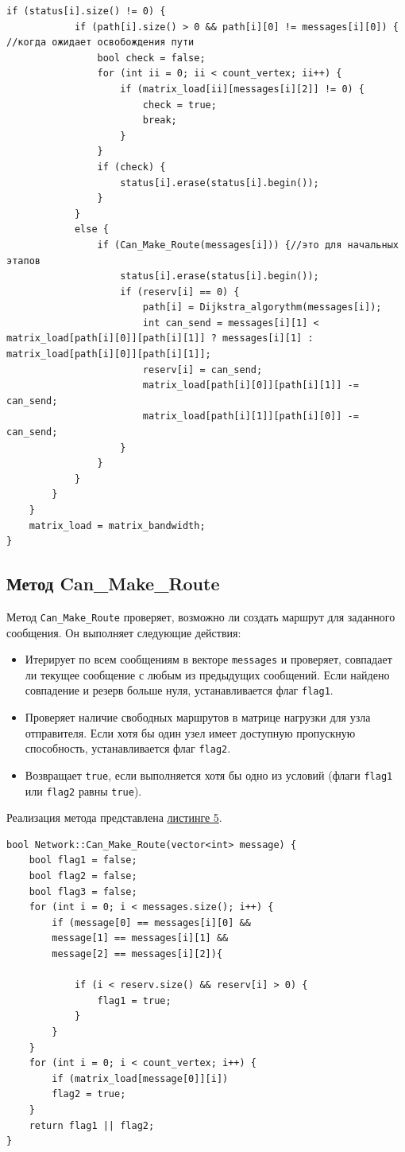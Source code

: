 \documentclass[11pt,a4paper,final]{article} %
\begin{document}
\begin{lstlisting}[label=lst4, caption = {Метод NextStep}]
		if (status[i].size() != 0) {
			if (path[i].size() > 0 && path[i][0] != messages[i][0]) { //когда ожидает освобождения пути
				bool check = false;
				for (int ii = 0; ii < count_vertex; ii++) {
					if (matrix_load[ii][messages[i][2]] != 0) {
						check = true;
						break;
					}
				}
				if (check) {
					status[i].erase(status[i].begin());
				}
			}
			else {
				if (Can_Make_Route(messages[i])) {//это для начальных этапов
					status[i].erase(status[i].begin());
					if (reserv[i] == 0) {
						path[i] = Dijkstra_algorythm(messages[i]);
						int can_send = messages[i][1] < matrix_load[path[i][0]][path[i][1]] ? messages[i][1] : matrix_load[path[i][0]][path[i][1]];
						reserv[i] = can_send;
						matrix_load[path[i][0]][path[i][1]] -= can_send;
						matrix_load[path[i][1]][path[i][0]] -= can_send;
					}
				}
			}
		}
	}
	matrix_load = matrix_bandwidth;
}

\end{lstlisting}

\subsection{Метод Can\_Make\_Route}

Метод \texttt{Can\_Make\_Route} проверяет, возможно ли создать маршрут для заданного сообщения. Он выполняет следующие действия:

\begin{itemize}
	\item Итерирует по всем сообщениям в векторе \texttt{messages} и проверяет, совпадает ли текущее сообщение с любым из предыдущих сообщений. Если найдено совпадение и резерв больше нуля, устанавливается флаг \texttt{flag1}.
	\item Проверяет наличие свободных маршрутов в матрице нагрузки для узла отправителя. Если хотя бы один узел имеет доступную пропускную способность, устанавливается флаг \texttt{flag2}.
	\item Возвращает \texttt{true}, если выполняется хотя бы одно из условий (флаги \texttt{flag1} или \texttt{flag2} равны \texttt{true}).
\end{itemize}

Реализация метода представлена \hyperref[lst5]{листинге 5}.

\begin{lstlisting}[label=lst5, caption = {Метод Can\_Make\_RouteStep}]
bool Network::Can_Make_Route(vector<int> message) {
	bool flag1 = false;
	bool flag2 = false;
	bool flag3 = false;
	for (int i = 0; i < messages.size(); i++) {
		if (message[0] == messages[i][0] &&
		message[1] == messages[i][1] &&
		message[2] == messages[i][2]){
			
			if (i < reserv.size() && reserv[i] > 0) {
				flag1 = true;
			}
		}
	}
	for (int i = 0; i < count_vertex; i++) {
		if (matrix_load[message[0]][i])
		flag2 = true;
	}
	return flag1 || flag2;
}
\end{lstlisting}
\end{document}
